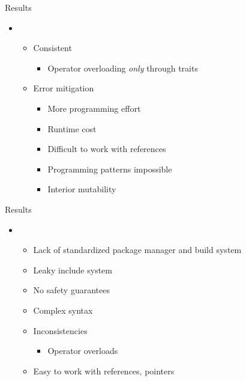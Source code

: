 \begin{frame}[t]{Results}

    \begin{itemize}
        \itemsep.3em

        \item {}
            \begin{itemize}
                \item Consistent
                    \begin{itemize}
                        \item Operator overloading \textit{only} through traits
                    \end{itemize}
                \item Error mitigation
                    \begin{itemize}
                        \item More programming effort
                        \item Runtime cost
                        \item Difficult to work with references
                        \item Programming patterns impossible
                        \item Interior mutability
                    \end{itemize}
            \end{itemize}

    \end{itemize}

    \vfill

\end{frame}

\begin{frame}[t]{Results}

    \begin{itemize}
        \itemsep.3em

        \item \tbf{\cpp}
            \begin{itemize}
                \item Lack of standardized package manager and build system
                \item Leaky include system
                \item No safety guarantees
                \item Complex syntax
                \item Inconsistencies
                    \begin{itemize}
                        \item Operator overloads
                    \end{itemize}
                \item Easy to work with references, pointers
            \end{itemize}

    \end{itemize}

    \vfill

\end{frame}

